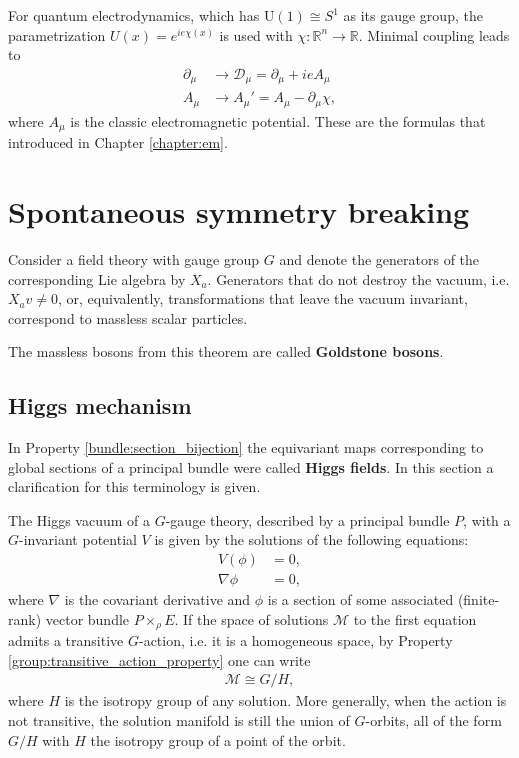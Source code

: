     \begin{example}[QED]
        For quantum electrodynamics, which has $\mathrm{U}(1)\cong S^1$ as its gauge group, the parametrization $U(x) = e^{ie\chi(x)}$ is used with $\chi:\mathbb{R}^n\rightarrow\mathbb{R}$. Minimal coupling leads to
        \begin{align}
            \partial_\mu &\longrightarrow\mathcal{D}_\mu = \partial_\mu + ieA_\mu\\
            A_\mu &\longrightarrow A_\mu' = A_\mu - \partial_\mu\chi,
        \end{align}
        where $A_\mu$ is the classic electromagnetic potential. These are the formulas that introduced in Chapter \ref{chapter:em}.
    \end{example}

\section{Spontaneous symmetry breaking}

    \begin{theorem}[Goldstone]
        Consider a field theory with gauge group $G$ and denote the generators of the corresponding Lie algebra by $X_a$. Generators that do not destroy the vacuum, i.e. $X_av\neq0$, or, equivalently, transformations that leave the vacuum invariant, correspond to massless scalar particles.
    \end{theorem}
    The massless bosons from this theorem are called \textbf{Goldstone bosons}.

\subsection{Higgs mechanism}\label{section:higgs_mechanism}

    In Property \ref{bundle:section_bijection} the equivariant maps corresponding to global sections of a principal bundle were called \textbf{Higgs fields}. In this section a clarification for this terminology is given.

    The Higgs vacuum of a $G$-gauge theory, described by a principal bundle $P$, with a $G$-invariant potential $V$ is given by the solutions of the following equations:
    \begin{align}
        V(\phi) &= 0,\\
        \nabla\phi &= 0,
    \end{align}
    where $\nabla$ is the covariant derivative and $\phi$ is a section of some associated (finite-rank) vector bundle $P\times_\rho E$. If the space of solutions $\mathcal{M}$ to the first equation admits a transitive $G$-action, i.e. it is a homogeneous space, by Property \ref{group:transitive_action_property} one can write
    \begin{gather}
        \mathcal{M}\cong G/H,
    \end{gather}
    where $H$ is the isotropy group of any solution. More generally, when the action is not transitive, the solution manifold is still the union of $G$-orbits, all of the form $G/H$ with $H$ the isotropy group of a point of the orbit.

